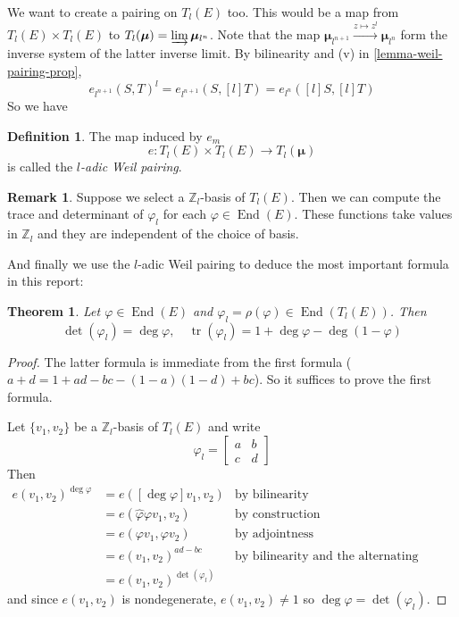\documentclass[12pt]{article}
\newtheorem{theorem}{Theorem}[subsection]
\theoremstyle{remark}
\theoremstyle{definition}
\newtheorem{remark}{Remark}[subsection]
\newtheorem{definition}{Definition}[subsection]
\newcommand{\Z}[0]{\mathbb{Z}}
\newcommand{\End}[0]{\operatorname{End}}
\begin{document}
        We want to create a pairing on $T_l(E)$ too. This would be a map from $T_l(E)\times T_l(E)$ to $T_l(\boldsymbol{\mu})=\varinjlim\boldsymbol{\mu}_{l^n}$. Note that the map $\boldsymbol{\mu}_{l^{n+1}}\xrightarrow{z\mapsto z^l}\boldsymbol{\mu}_{l^n}$ form the inverse system of the latter inverse limit. By bilinearity and (v) in \autoref{lemma-weil-pairing-prop},
        \[e_{l^{n+1}}(S, T)^l=e_{l^{n+1}}(S, [l]T)=e_{l^n}([l]S, [l]T)\]
        So we have
        \begin{definition}
            The map induced by $e_m$
            \[e:T_l(E)\times T_l(E)\to T_l(\boldsymbol{\mu})\]
            is called the \textit{$l$-adic Weil pairing}.
        \end{definition}
        \begin{remark}
            Suppose we select a $\Z_l$-basis of $T_l(E)$. Then we can compute the trace and determinant of $\varphi_l$ for each $\varphi\in\End(E)$. These functions take values in $\Z_l$ and they are independent of the choice of basis.
        \end{remark}
        And finally we use the $l$-adic Weil pairing to deduce the most important formula in this report:
        \begin{theorem}\label{theorem-map-deg-tr}
            Let $\varphi\in \End(E)$ and $\varphi_l=\rho(\varphi)\in\End(T_l(E))$. Then
            \[\det(\varphi_l)=\deg\varphi,\quad\operatorname{tr}(\varphi_l)=1+\deg\varphi-\deg(1-\varphi)\]
        \end{theorem}
        \begin{proof}
            The latter formula is immediate from the first formula ($a+d=1+ad-bc-(1-a)(1-d)+bc$). So it suffices to prove the first formula.
            
            Let $\{v_1,v_2\}$ be a $\Z_l$-basis of $T_l(E)$ and write
            \[\varphi_l=\begin{bmatrix}
            a & b\\
            c & d
            \end{bmatrix}\]
            Then
            \begin{align*}
                e(v_1,v_2)^{\deg\varphi}&=e([\deg\varphi]v_1,v_2)&\text{by bilinearity}\\
                &=e(\hat\varphi\varphi v_1,v_2)&\text{by construction}\\
                &=e(\varphi v_1,\varphi v_2)&\text{by adjointness}\\
                &=e(v_1,v_2)^{ad-bc}&\text{by bilinearity and the alternating property}\\
                &=e(v_1,v_2)^{\det(\varphi_l)}&
            \end{align*}
            and since $e(v_1,v_2)$ is nondegenerate, $e(v_1,v_2)\neq 1$ so $\deg\varphi=\det(\varphi_l)$.
        \end{proof}
        
\end{document}
